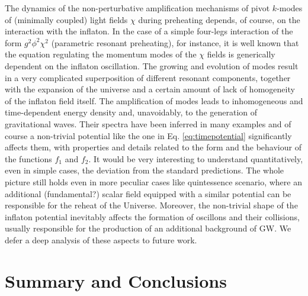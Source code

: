 \documentclass[%
aps,prd,nofootinbib,showkeys,a4paper,10pt
]{revtex4-2}
\begin{document}
The dynamics of the non-perturbative amplification mechanisms of pivot $k$-modes of (minimally coupled) light fields $\chi$ during preheating depends, 
of course, on the interaction with the inflaton.
In the case of a simple four-legs 
interaction of the form $g^2\phi^2\chi^2$
(parametric resonant preheating), for instance, 
it is well known that the equation regulating the momentum modes of the $\chi$ fields is generically dependent on the inflaton oscillation. 
The growing and evolution of modes result in a very complicated superposition of different resonant components, 
together with the expansion of the universe and a certain amount of lack of homogeneity of the inflaton field itself.  
The amplification of modes leads to inhomogeneous and time-dependent energy density and, unavoidably, to the generation of gravitational waves.  
Their spectra have been inferred in many examples \cite{39} and of course a non-trivial potential like the one 
in Eq. \eqref{eq:timepotential} significantly affects them, 
with properties and details related to the form and the behaviour of the functions $f_1$ and $f_2$.  
It would be very interesting to understand quantitatively, even in simple cases, the deviation from the standard predictions.  
The whole picture still holds even in more peculiar cases like quintessence scenario, where an additional (fundamental?)
scalar field equipped with a similar potential can be responsible for the reheat of the Universe.
Moreover, the non-trivial shape of the inflaton potential inevitably affects the formation of oscillons and their collisions, 
usually responsible for the production of an additional background of GW.
We defer a deep analysis of these aspects to future work.




\section{Summary and Conclusions}
\end{document}
